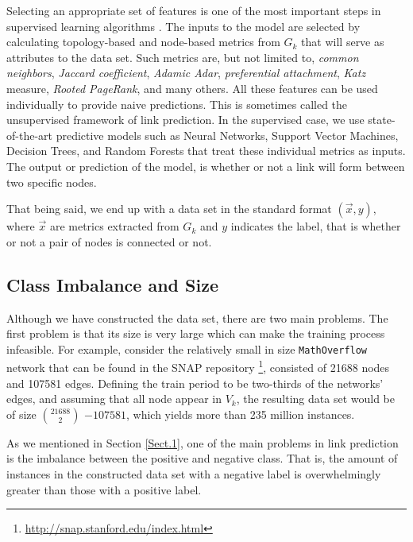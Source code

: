 \documentclass{acm_proc_article-sp}
\begin{document}
Selecting an appropriate set of features is one of the most important steps in supervised learning algorithms \cite{Hasan06linkprediction}. The inputs to the model are selected by calculating topology-based and node-based metrics from $G_k$ that will serve as attributes to the data set. Such metrics are, but not limited to, \textit{common neighbors}, \textit{Jaccard coefficient}, \textit{Adamic Adar}, \textit{preferential attachment}, \textit{Katz} measure, \textit{Rooted PageRank}, and many others. All these features can be used individually to provide naive predictions. This is sometimes called the unsupervised framework of link prediction. In the supervised case, we use state-of-the-art predictive models such as Neural Networks, Support Vector Machines, Decision Trees, and Random Forests that treat these individual metrics as inputs. The output or prediction of the model, is whether or not a link will form between two specific nodes. 

That being said, we end up with a data set in the standard format $(\vec{x},y)$, where $\vec{x}$ are metrics extracted from $G_k$ and $y$ indicates the label, that is whether or not a pair of nodes is connected or not. 

\subsection{Class Imbalance and Size}
\label{Sect.2b}
Although we have constructed the data set, there are two main problems. The first problem is that its size is very large which can make the training process infeasible. For example, consider the relatively small in size \texttt{MathOverflow} network \cite{Paranjape:2017:MTN:3018661.3018731} that can be found in the SNAP repository \footnote{\url{http://snap.stanford.edu/index.html}}, consisted of 21688 nodes and 107581 edges. Defining the train period to be two-thirds of the networks' edges, and assuming that all node appear in $V_k$, the resulting data set would be of size $21688 \choose 2$ $ - 107581$, which yields more than 235 million instances.

As we mentioned in Section \ref{Sect.1}, one of the main problems in link prediction is the imbalance between the positive and negative class. That is, the amount of instances in the constructed data set with a negative label is overwhelmingly greater than those with a positive label. 
\end{document}
